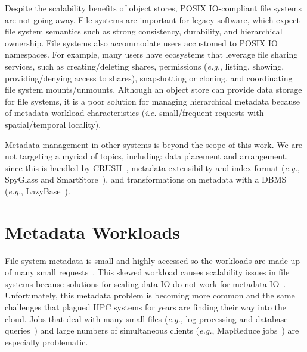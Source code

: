 Despite the scalability benefits of object stores, POSIX IO-compliant file
systems are not going away. File systems are important for legacy software,
which expect file system semantics such as strong consistency, durability, and
hierarchical ownership.  File systems also accommodate users accustomed to
POSIX IO namespaces. For example, many users have ecosystems that leverage file
sharing services, such as creating/deleting shares, permissions ({\it e.g.},
listing, showing, providing/denying access to shares), snapshotting or
cloning, and coordinating file system mounts/unmounts.  Although an object
store can provide data storage for file systems, it is a poor solution for
managing hierarchical metadata because of metadata workload characteristics
({\it i.e.} small/frequent requests with spatial/temporal locality).

Metadata management in other systems is beyond the scope of this work. We are
not targeting a myriad of topics, including: data placement and arrangement,
since this is handled by CRUSH~\cite{weil:osdi2006-ceph}, metadata
extensibility and index format ({\it e.g.}, SpyGlass\cite{leung:fast2009-spyglass} and
SmartStore~\cite{hua:sc2009-smartstore}), and transformations on metadata with
a DBMS ({\it e.g.}, LazyBase~\cite{cipar:eurosys2012-lazybase}). 



\section{Metadata Workloads}

File system metadata is small and highly accessed so the workloads are made up
of many small requests~\cite{roselli:atec2000-FS-workloads,
abad:ucc2012-mimesis}.  This skewed workload causes scalability issues in file
systems because solutions for scaling data IO do not work for metadata
IO~\cite{roselli:atec2000-FS-workloads, abad:techreport2012-fstrace,
alam:pdsw2011-metadata-scaling, weil:osdi2006-ceph}.  Unfortunately, this
metadata problem is becoming more common and the same challenges that plagued
HPC systems for years are finding their way into the cloud.  Jobs that deal
with many small files ({\it e.g.}, log processing and database
queries~\cite{thusoo:sigmod2010-facebook-infrastructure}) and large numbers of
simultaneous clients ({\it e.g.}, MapReduce
jobs~\cite{mckusick:acm2010-gfs-evolution}) are especially problematic.

